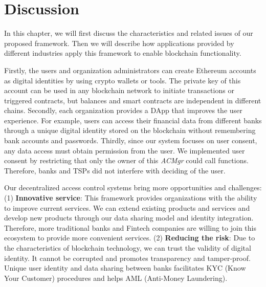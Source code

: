 \chapter{Discussion}
\label{chapter:discussion}

In this chapter, we will first discuss the characteristics and related issues of our proposed framework. Then we will describe how applications provided by different industries apply this framework to enable blockchain functionality.
\par 

Firstly, the users and organization administrators can create Ethereum accounts as digital identities by using crypto wallets or tools. The private key of this account can be used in any blockchain network to initiate transactions or triggered contracts, but balances and smart contracts are independent in different chains. Secondly, each organization provides a DApp that improves the user experience. For example, users can access their financial data from different banks through a unique digital identity stored on the blockchain without remembering bank accounts and passwords. Thirdly, since our system focuses on user consent, any data access must obtain permission from the user. We implemented user consent by restricting that only the owner of this \textit{ACMgr} could call functions. Therefore, banks and TSPs did not interfere with deciding of the user.
\par 

Our decentralized access control systems bring more opportunities and challenges: (1) \textbf{Innovative service}: This framework provides organizations with the ability to improve current services. We can extend existing products and services and develop new products through our data sharing model and identity integration. Therefore, more traditional banks and Fintech companies are willing to join this ecosystem to provide more convenient services. (2) \textbf{Reducing the risk}: Due to the characteristics of blockchain technology, we can trust the validity of digital identity. It cannot be corrupted and promotes transparency and tamper-proof. Unique user identity and data sharing between banks facilitates KYC (Know Your Customer) procedures and helps AML (Anti-Money Laundering).

